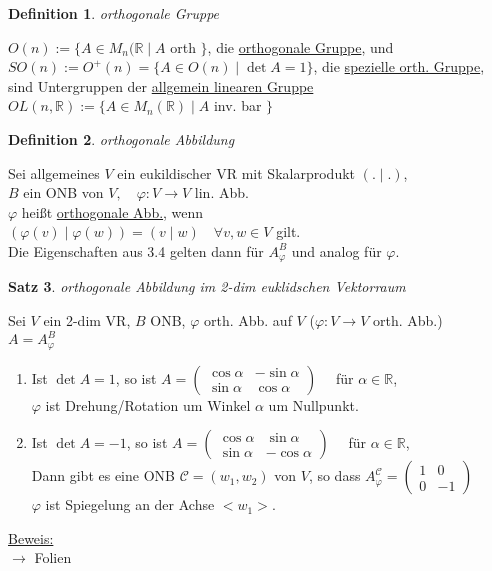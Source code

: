 \documentclass[a4paper,11pt]{article}
\newtheorem{definition}{Definition}[section]
\newtheorem{satz}[definition]{Satz}
\begin{document}
\begin{definition}
	orthogonale Gruppe
\end{definition}
$O(n):=\{A\in M_n(\mathbb{R}\mid A$ orth $\}$, die \underline{orthogonale Gruppe}, und \\
$SO(n):=O^+(n)=\{A\in O(n)\mid\det A=1\}$, die \underline{spezielle orth. Gruppe}, \\
sind Untergruppen der \underline{allgemein linearen Gruppe} \\
$OL(n,\mathbb{R}):=\{A\in M_n(\mathbb{R})\mid A$ inv. bar $\}$

\begin{definition}
	orthogonale Abbildung
\end{definition}
Sei allgemeines $V$ ein eukildischer VR mit Skalarprodukt $(.\mid.)$, \\
$B$ ein ONB von $V,\quad\varphi\colon V\to V$ lin. Abb. \\
$\varphi$ heißt \underline{orthogonale Abb.}, wenn \\
$(\varphi(v)\mid\varphi(w))=(v\mid w)\quad\forall v,w\in V$ gilt. \\Die Eigenschaften aus 3.4 gelten dann für $A^B_\varphi$ und analog für $\varphi$.

\newpage

\begin{satz}
	orthogonale Abbildung im 2-dim euklidschen Vektorraum
\end{satz}
Sei $V$ ein 2-dim VR, $B$ ONB, $\varphi$ orth. Abb. auf $V$ ($\varphi\colon V\to V$ orth. Abb.) \\
$A=A^B_\varphi$
\begin{enumerate}[label=\alph*)]
	\item Ist $\det A=1$, so ist $A=\begin{pmatrix}\cos\alpha & -\sin\alpha \\ \sin\alpha & \cos\alpha\end{pmatrix}\quad$ für $\alpha\in\mathbb{R}$, \\
	$\varphi$ ist Drehung/Rotation um Winkel $\alpha$ um Nullpunkt.
	\item Ist $\det A=-1$, so ist $A=\begin{pmatrix}\cos\alpha & \sin\alpha \\ \sin\alpha & -\cos\alpha\end{pmatrix}\quad$ für $\alpha\in\mathbb{R}$, \\
	Dann gibt es eine ONB $\mathcal{C}=(w_1,w_2)$ von $V$, so dass $A^\mathcal{C}_\varphi=\begin{pmatrix}1&0\\0&-1\end{pmatrix}$ \\
	$\varphi$ ist Spiegelung an der Achse $<w_1>$.
\end{enumerate}
\underline{Beweis:} \\
$\rightarrow$ Folien
\end{document}
